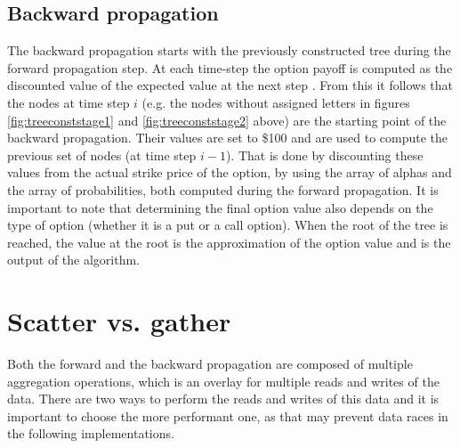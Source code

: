 \subsection{Backward propagation}
The backward propagation starts with the previously constructed tree during the forward propagation step. At each time-step the option payoff is computed as the discounted value of the expected value at the next step \cite[pg. 6]{uhwirt}. From this it follows that the nodes at time step $i$ (e.g. the nodes without assigned letters in figures \ref{fig:treeconststage1} and \ref{fig:treeconststage2} above) are the starting point of the backward propagation. Their values are set to \$100 and are used to compute the previous set of nodes (at time step $i-1$). That is done by discounting these values from the actual strike price of the option, by using the array of alphas and the array of probabilities, both computed during the forward propagation. It is important to note that determining the final option value also depends on the type of option (whether it is a put or a call option). When the root of the tree is reached, the value at the root is the approximation of the option value and is the output of the algorithm. 

\section{Scatter vs. gather}
Both the forward and the backward propagation are composed of multiple aggregation operations, which is an overlay for multiple reads and writes of the data. There are two ways to perform the reads and writes of this data and it is important to choose the more performant one, as that may prevent data races in the following implementations. 

